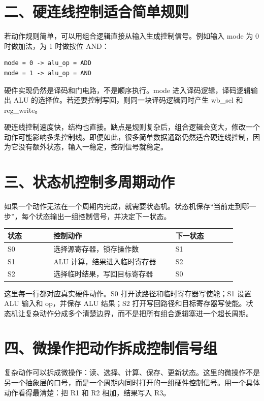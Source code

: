 \section{二、硬连线控制适合简单规则}

若动作规则简单，可以用组合逻辑直接从输入生成控制信号。例如输入 mode 为 0 时做加法，为 1 时做按位 AND：

\begin{lstlisting}
mode = 0 -> alu_op = ADD
mode = 1 -> alu_op = AND
\end{lstlisting}

硬件实现仍然是译码和门电路，不是顺序执行。mode 进入译码逻辑，译码逻辑输出 ALU 的选择位。若还要控制写回，则同一块译码逻辑同时产生 wb\_sel 和 reg\_write。

硬连线控制速度快，结构也直接。缺点是规则复杂后，组合逻辑会变大，修改一个动作可能影响多条控制线。即便如此，很多简单数据通路仍然适合硬连线控制，因为它没有额外状态，输入一稳定，控制信号就稳定。

\section{三、状态机控制多周期动作}

如果一个动作无法在一个周期内完成，就需要状态机。状态机保存“当前走到哪一步”，每个状态输出一组控制信号，并决定下一状态。

\begin{longtable}{p{0.18\linewidth}p{0.48\linewidth}p{0.24\linewidth}}
\toprule
状态 & 控制动作 & 下一状态 \\
\midrule
S0 & 选择源寄存器，锁存操作数 & S1 \\
S1 & ALU 计算，结果进入临时寄存器 & S2 \\
S2 & 选择临时结果，写回目标寄存器 & S0 \\
\bottomrule
\end{longtable}

这里每一行都对应真实硬件动作。S0 打开读路径和临时寄存器写使能；S1 设置 ALU 输入和 op，并保存 ALU 结果；S2 打开写回路径和目标寄存器写使能。状态机让复杂动作分成多个清楚边界，而不是把所有组合逻辑塞进一个超长周期。

\section{四、微操作把动作拆成控制信号组}

复杂动作可以拆成微操作：读、选择、计算、保存、更新状态。这里的微操作不是另一个抽象层的口号，而是一个周期内同时打开的一组硬件控制信号。用一个具体动作看得最清楚：把 R1 和 R2 相加，结果写入 R3。

